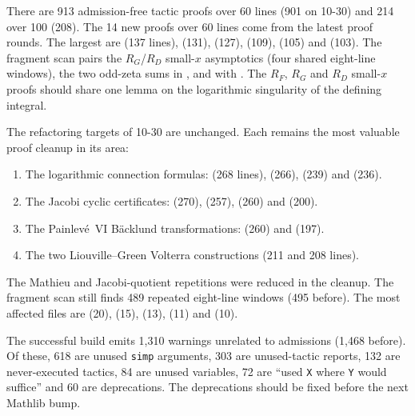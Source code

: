\documentclass[11pt,a4paper]{article}
\begin{document}
There are 913 admission-free tactic proofs over 60 lines (901 on 10-30) and 214 over 100
(208). The 14 new proofs over 60 lines come from the latest proof rounds. The largest are
 (137 lines),  (131),
 (127),  (109),
 (105) and
 (103). The fragment scan pairs the
$R_G$/$R_D$ small-$x$ asymptotics (four shared eight-line windows), the two odd-zeta sums in
, and  with
. The $R_F$, $R_G$ and $R_D$ small-$x$ proofs should share one
lemma on the logarithmic singularity of the defining integral.

The refactoring targets of 10-30 are unchanged. Each remains the most valuable proof cleanup
in its area:
\begin{enumerate}
  \item The logarithmic connection formulas: 
    (268 lines),  (266),  (239) and
     (236).
  \item The Jacobi cyclic certificates:  (270),
     (257),  (260) and
     (200).
  \item The Painlev\'e~VI B\"acklund transformations:  (260)
    and  (197).
  \item The two Liouville--Green Volterra constructions (211 and 208 lines).
\end{enumerate}
The Mathieu and Jacobi-quotient repetitions were reduced in the cleanup. The fragment scan
still finds 489 repeated eight-line windows (495 before). The most affected files are
 (20),  (15),
 (13), 
(11) and  (10).

The successful build emits 1{,}310 warnings unrelated to admissions (1{,}468 before). Of
these, 618 are unused \texttt{simp} arguments, 303 are unused-tactic reports, 132 are
never-executed tactics, 84 are unused variables, 72 are ``used \texttt{X} where \texttt{Y}
would suffice'' and 60 are deprecations. The deprecations should be fixed before the next
Mathlib bump.
\end{document}
